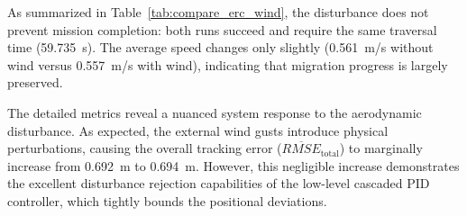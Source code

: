 \documentclass[pdflatex,sn-basic]{sn-jnl}%
\begin{document}
        \begin{table}
            \centering
            \caption{ERC robustness comparison for Scenario~3 (wind disturbance).}
            \label{tab:compare_erc_wind}
            \small

        \end{table}

        As summarized in Table~\ref{tab:compare_erc_wind}, the disturbance does not prevent mission completion: both runs succeed and require the same traversal time (59.735~s). The average speed changes only slightly (0.561~m/s without wind versus 0.557~m/s with wind), indicating that migration progress is largely preserved.

        The detailed metrics reveal a nuanced system response to the aerodynamic disturbance. As expected, the external wind gusts introduce physical perturbations, causing the overall tracking error ($\overline{RMSE}_{\text{total}}$) to marginally increase from 0.692~m to 0.694~m. However, this negligible increase demonstrates the excellent disturbance rejection capabilities of the low-level cascaded PID controller, which tightly bounds the positional deviations.
\end{document}
